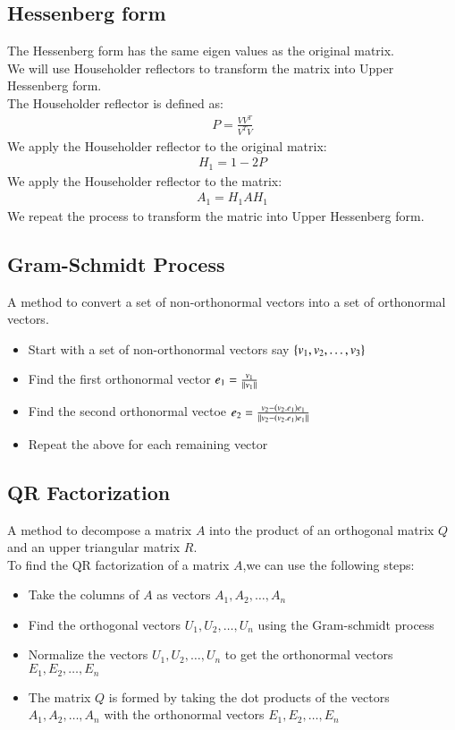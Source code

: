 \documentclass[journal]{IEEEtran}
\begin{document}
\subsection{Hessenberg form}
The Hessenberg form has the same eigen values as the original matrix.\\We will use Householder reflectors to transform the matrix into Upper Hessenberg form.\\The Householder reflector is defined as:
\begin{align*}
     P=\frac{VV^T}{V^TV}
\end{align*}
We apply the Householder reflector to the original matrix:
\begin{align*}
    H_1=1-2P    
\end{align*}
We apply the Householder reflector to the matrix:
\begin{align*}
    A_1=H_1AH_1
\end{align*}
We repeat the process to transform the matric into Upper Hessenberg form.
\subsection{Gram-Schmidt Process}
A method to convert a set of non-orthonormal vectors into a set of orthonormal vectors.
\begin{itemize}
    \item Start with a set of non-orthonormal vectors say $\left\{v_1,v_2,\dots,v_3\right\}$
    \item Find the first orthonormal vector $e_1=\frac{v_1}{\left\lVert v_1\right\rVert}$ 
    \item Find the second orthonormal vectoe $e_2=\frac{v_2-(v_2.e_1)e_1}{\left\lVert v_2-(v_2.e_1)e_1\right\rVert}$
    \item Repeat the above for each remaining vector
\end{itemize}
\subsection{QR Factorization}
A method to decompose a matrix $A$ into the product of an orthogonal matrix $Q$ and an upper triangular matrix $R$.\\To find the QR factorization of a matrix $A$,we can use the following steps:
\begin{itemize}
    \item Take the columns of $A$ as vectors $A_1,A_2,\dots,A_n$
    \item Find the orthogonal vectors $U_1,U_2,\dots,U_n$ using the Gram-schmidt process
    \item Normalize the vectors $U_1,U_2,\dots,U_n$ to get the orthonormal vectors $E_1,E_2,\dots,E_n$
    \item The matrix $Q$ is formed by taking the dot products of the vectors $A_1,A_2,\dots,A_n$ with the orthonormal vectors $E_1,E_2,\dots,E_n$
\end{itemize}
\end{document}
